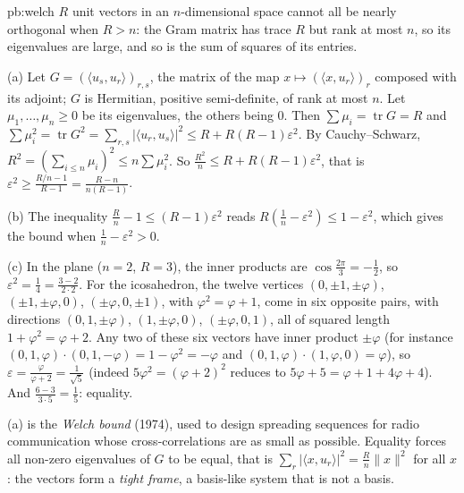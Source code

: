 \begin{solution}{pb:welch}
\idea $R$ unit vectors in an $n$-dimensional space cannot all be nearly orthogonal when $R>n$: the Gram matrix has trace $R$ but rank at most $n$, so its eigenvalues
are large, and so is the sum of squares of its entries.

\writeup (a) Let $G=(\langle u_s,u_r\rangle)_{r,s}$, the matrix of the map $x\mapsto(\langle x,u_r\rangle)_r$ composed with its adjoint; $G$ is Hermitian, positive semi-definite, of rank
at most $n$. Let $\mu_1,\dots,\mu_n\ge0$ be its eigenvalues, the others being $0$. Then $\sum\mu_i=\operatorname{tr}G=R$ and
$\sum\mu_i^2=\operatorname{tr}G^2=\sum_{r,s}|\langle u_r,u_s\rangle|^2\le R+R(R-1)\varepsilon^2$. By Cauchy--Schwarz, $R^2=(\sum_{i\le n}\mu_i)^2\le n\sum\mu_i^2$. So
$\frac{R^2}n\le R+R(R-1)\varepsilon^2$, that is $\varepsilon^2\ge\frac{R/n-1}{R-1}=\frac{R-n}{n(R-1)}$.

(b) The inequality $\frac Rn-1\le(R-1)\varepsilon^2$ reads $R(\frac1n-\varepsilon^2)\le1-\varepsilon^2$, which gives the bound when $\frac1n-\varepsilon^2>0$.

(c) In the plane ($n=2$, $R=3$), the inner products are $\cos\frac{2\pi}3=-\frac12$, so $\varepsilon^2=\frac14=\frac{3-2}{2\cdot2}$. For the icosahedron, the twelve vertices
$(0,\pm1,\pm\varphi)$, $(\pm1,\pm\varphi,0)$, $(\pm\varphi,0,\pm1)$, with $\varphi^2=\varphi+1$, come in six opposite pairs, with directions $(0,1,\pm\varphi)$, $(1,\pm\varphi,0)$,
$(\pm\varphi,0,1)$, all of squared length $1+\varphi^2=\varphi+2$. Any two of these six vectors have inner product $\pm\varphi$ (for instance $(0,1,\varphi)\cdot(0,1,-\varphi)=1-\varphi^2=-\varphi$
and $(0,1,\varphi)\cdot(1,\varphi,0)=\varphi$), so $\varepsilon=\frac\varphi{\varphi+2}=\frac1{\sqrt5}$ (indeed $5\varphi^2=(\varphi+2)^2$ reduces to $5\varphi+5=\varphi+1+4\varphi+4$). And
$\frac{6-3}{3\cdot5}=\frac15$: equality.

\leads (a) is the \emph{Welch bound} (1974), used to design spreading sequences for radio communication whose cross-correlations are as small as possible. Equality forces all non-zero
eigenvalues of $G$ to be equal, that is $\sum_r|\langle x,u_r\rangle|^2=\frac Rn\|x\|^2$ for all $x$: the vectors form a \emph{tight frame}, a basis-like system that is not a basis.
\end{solution}

